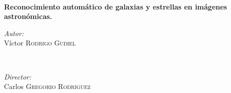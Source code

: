 \begin{titlepage}
		\HRule \\[0.2cm]
		{ \huge \bfseries Reconocimiento automático de galaxias y estrellas en imágenes astronómicas.} %
		\HRule \\[0.4cm]
		
		
		\begin{minipage}{0.4\textwidth}
			\begin{flushleft} \large
				\emph{Autor:}\\
				Víctor \textsc{Rodrigo Gudiel} %
			\end{flushleft}
		\end{minipage}
		~
		\begin{minipage}{0.4\textwidth}
			\begin{flushright} \large
				\emph{Director:} \\
				Carlos  \textsc{Gregorio Rodriguez} %
			\end{flushright}
		\end{minipage}\\[0.4cm] 
		

		
			
		\vfill %
		
	\end{titlepage}

